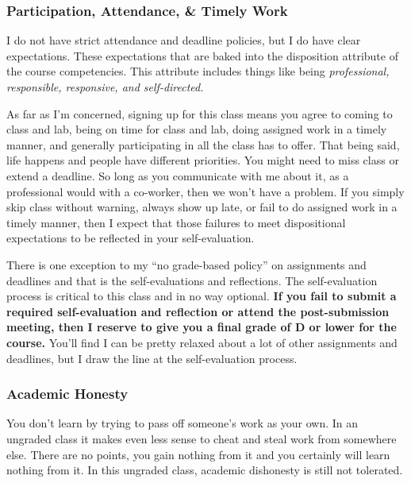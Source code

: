 \documentclass[10pt]{article}
\begin{document}
\subsubsection{Participation, Attendance, \& Timely Work}

I do not have strict attendance and deadline policies, but I do have clear expectations. These expectations that are baked into the disposition attribute of the course competencies. This attribute includes things like being \textit{professional, responsible, responsive, and self-directed.}

As far as I'm concerned, signing up for this class means you agree to coming to class and lab, being on time for class and lab, doing assigned work in a timely manner, and generally participating in all the class has to offer.  That being said, life happens and people have different priorities.  You might need to miss class or extend a deadline.  So long as you communicate with me about it, as a professional would with a co-worker, then we won't have a problem. If you simply skip class without warning, always show up late, or fail to do assigned work in a timely manner, then I expect that those failures to meet dispositional expectations to be reflected in your self-evaluation.

There is one exception to my ``no grade-based policy'' on assignments and deadlines and that is the self-evaluations and reflections. The self-evaluation process is critical to this class and in no way optional. \textbf{If you fail to submit a required self-evaluation and reflection or attend the post-submission meeting, then I reserve to give you a final grade of D or lower for the course.} You'll find I can be pretty relaxed about a lot of other assignments and deadlines, but I draw the line at the self-evaluation process.


\subsubsection*{Academic Honesty}

You don't learn by trying to pass off someone's work as your own. In an ungraded class it makes even less sense to cheat and steal work from somewhere else.  There are no points, you gain nothing from it and you certainly will learn nothing from it. In this ungraded class, academic dishonesty is still not tolerated.
\end{document}
